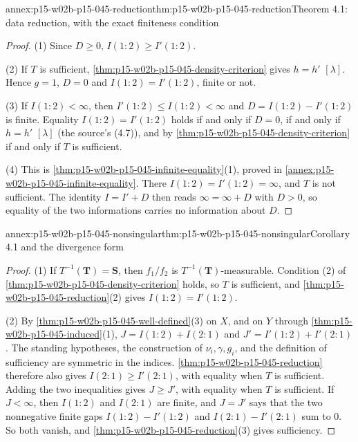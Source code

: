\begin{annexitem}{annex:p15-w02b-p15-045-reduction}{thm:p15-w02b-p15-045-reduction}{Theorem 4.1: data reduction, with the exact finiteness condition}
\begin{proof}
(1) Since \(D\geq0\), \(I(1:2)\geq I'(1:2)\).

(2) If \(T\) is sufficient, \cref{thm:p15-w02b-p15-045-density-criterion}
gives \(h=h'\) \([\lambda]\). Hence \(g=1\), \(D=0\) and
\(I(1:2)=I'(1:2)\), finite or not.

(3) If \(I(1:2)<\infty\), then \(I'(1:2)\leq I(1:2)<\infty\) and
\(D=I(1:2)-I'(1:2)\) is finite. Equality \(I(1:2)=I'(1:2)\) holds if and
only if \(D=0\), if and only if \(h=h'\) \([\lambda]\) (the source's
(4.7)), and by \cref{thm:p15-w02b-p15-045-density-criterion} if and only
if \(T\) is sufficient.

(4) This is \cref{thm:p15-w02b-p15-045-infinite-equality}(1), proved in
\cref{annex:p15-w02b-p15-045-infinite-equality}. There
\(I(1:2)=I'(1:2)=\infty\), and \(T\) is not sufficient. The identity
\(I=I'+D\) then reads \(\infty=\infty+D\) with \(D>0\), so equality of
the two informations carries no information about \(D\).
\end{proof}
\end{annexitem}

\begin{annexitem}{annex:p15-w02b-p15-045-nonsingular}{thm:p15-w02b-p15-045-nonsingular}{Corollary 4.1 and the divergence form}
\begin{proof}
(1) If \(T^{-1}(\mathbf T)=\mathbf S\), then \(f_1/f_2\) is
\(T^{-1}(\mathbf T)\)-measurable. Condition (2) of
\cref{thm:p15-w02b-p15-045-density-criterion} holds, so \(T\) is
sufficient, and \cref{thm:p15-w02b-p15-045-reduction}(2) gives
\(I(1:2)=I'(1:2)\).

(2) By \cref{thm:p15-w02b-p15-045-well-defined}(3) on \(X\), and on
\(Y\) through \cref{thm:p15-w02b-p15-045-induced}(1),
\(J=I(1:2)+I(2:1)\) and \(J'=I'(1:2)+I'(2:1)\). The standing hypotheses,
the construction of \(\nu_i,\gamma,g_i\), and the definition of
sufficiency are symmetric in the indices.
\cref{thm:p15-w02b-p15-045-reduction} therefore also gives
\(I(2:1)\geq I'(2:1)\), with equality when \(T\) is sufficient. Adding
the two inequalities gives \(J\geq J'\), with equality when \(T\) is
sufficient. If \(J<\infty\), then \(I(1:2)\) and \(I(2:1)\) are finite,
and \(J=J'\) says that the two nonnegative finite gaps
\(I(1:2)-I'(1:2)\) and \(I(2:1)-I'(2:1)\) sum to \(0\). So both vanish,
and \cref{thm:p15-w02b-p15-045-reduction}(3) gives sufficiency.
\end{proof}
\end{annexitem}

